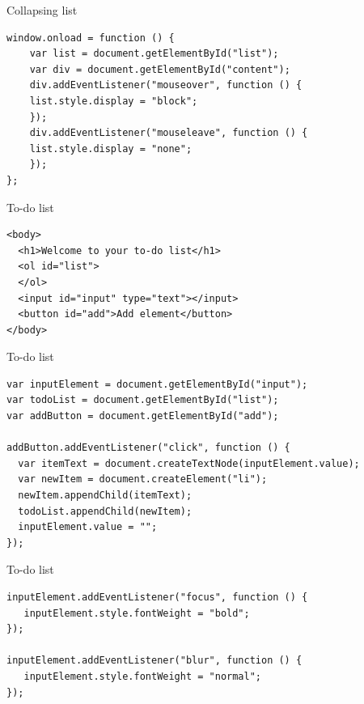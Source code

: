 \documentclass{beamer}
\begin{document}
\begin{frame}[fragile,label={sec:orgheadline59}]{Collapsing list}
 \begin{block}{}
\begin{verbatim}
window.onload = function () {
    var list = document.getElementById("list");
    var div = document.getElementById("content");
    div.addEventListener("mouseover", function () {
	list.style.display = "block";
    });
    div.addEventListener("mouseleave", function () {
	list.style.display = "none";
    });
};
\end{verbatim}
\end{block}
\end{frame}
\begin{frame}[fragile,label={sec:orgheadline60}]{To-do list}
 \begin{block}{}
\begin{verbatim}
<body>
  <h1>Welcome to your to-do list</h1>
  <ol id="list">
  </ol>
  <input id="input" type="text"></input>
  <button id="add">Add element</button>
</body>
\end{verbatim}
\end{block}
\end{frame}
\begin{frame}[fragile,label={sec:orgheadline61}]{To-do list}
 \begin{block}{}
\begin{verbatim}
var inputElement = document.getElementById("input");
var todoList = document.getElementById("list");
var addButton = document.getElementById("add");

addButton.addEventListener("click", function () {
  var itemText = document.createTextNode(inputElement.value);
  var newItem = document.createElement("li");
  newItem.appendChild(itemText);
  todoList.appendChild(newItem);
  inputElement.value = "";
});
\end{verbatim}
\end{block}
\end{frame}
\begin{frame}[fragile,label={sec:orgheadline62}]{To-do list}
 \begin{block}{}
\begin{verbatim}
inputElement.addEventListener("focus", function () {
   inputElement.style.fontWeight = "bold";
});

inputElement.addEventListener("blur", function () {
   inputElement.style.fontWeight = "normal";
});
\end{verbatim}
\end{block}
\end{frame}
\end{document}
